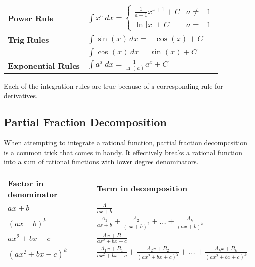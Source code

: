 \begin{center}
\def\arraystretch{1.5}
\begin{tabular}{@{}ll@{}}
\toprule[0.4mm]
\textbf{Power Rule}
 & $\int x^a \ dx = \begin{cases}
\frac{1}{a+1}x^{a+1} + C & a \neq -1\\
\ln|x| + C & a = -1
\end{cases}$ \\
\textbf{Trig Rules}  & $\int \sin(x)\ dx = -\cos(x)+C$\\
                     & $\int \cos(x)\ dx = \sin(x)+C$ \\
\textbf{Exponential Rules} & $\int a^x\ dx = \frac{1}{\ln(a)}a^x+C$ \\
\bottomrule[0.4mm]
\end{tabular}
\end{center}

Each of the integration rules are true because of a corresponding rule for derivatives. 



\subsection{Partial Fraction Decomposition}

When attempting to integrate a rational function, partial fraction decomposition is a common trick that comes in handy. It effectively breaks a rational function into a sum of rational functions with lower degree denominators.



\begin{center}
\def\arraystretch{1.5}
\begin{tabular}{@{}ll@{}}
\toprule[0.4mm]
      Factor in denominator & Term in decomposition\\
      \hline
      $ax+b$          & $\frac{A}{ax+b}$ \\
      $(ax+b)^k$      & $\frac{A_1}{ax+b}+\frac{A_2}{(ax+b)^2}+\dots+\frac{A_k}{(ax+b)^k}$ \\
      $ax^2+bx+c$     & $\frac{Ax+B}{ax^2+bx+c}$\\
      $(ax^2+bx+c)^k$ & $\frac{A_1x+B_1}{ax^2+bx+c}+\frac{A_2x+B_2}{(ax^2+bx+c)^2}+\dots+\frac{A_kx+B_k}{(ax^2+bx+c)^k}$ \\
\bottomrule[0.4mm]
    \end{tabular}
\end{center}


